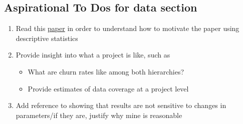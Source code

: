 \documentclass[12pt,notitlepage]{article}
\begin{document}
\subsection{Aspirational To Dos for data section }
\begin{enumerate}
    \item Read this  \href{https://pubs.aeaweb.org/doi/pdfplus/10.1257/jep.36.3.211}{paper} in order to understand how to motivate the paper using descriptive statistics
    \item Provide insight into what a project is like, such as
    \begin{itemize}
        \item What are churn rates like among both hierarchies?
        \item Provide estimates of data coverage at a project level     
    \end{itemize}
    \item Add reference to showing that results are not sensitive to changes in parameters/if they are, justify why mine is reasonable 
\end{enumerate}
\end{document}
